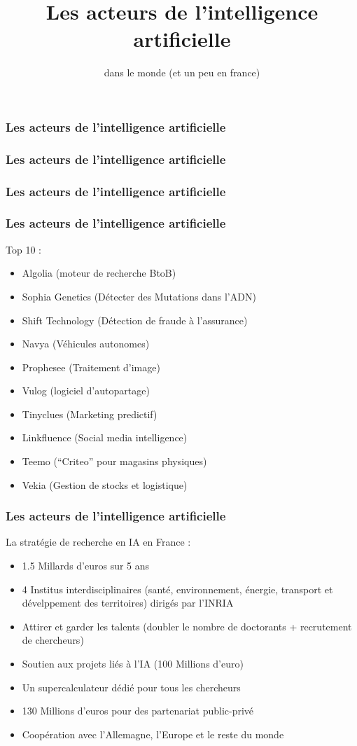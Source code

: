 \documentclass{formation}
\title{Les acteurs de l'intelligence artificielle}
\subtitle{dans le monde (et un peu en france)}
\begin{document}
\maketitle

\begin{frame}
  \frametitle{Les acteurs de l'intelligence artificielle}
\end{frame}

\begin{frame}
  \frametitle{Les acteurs de l'intelligence artificielle}
\end{frame}

\begin{frame}
  \frametitle{Les acteurs de l'intelligence artificielle}
\end{frame}

\begin{frame}
  \frametitle{Les acteurs de l'intelligence artificielle}
  Top 10 :
  \begin{itemize}
  \item Algolia (moteur de recherche BtoB)
  \item Sophia Genetics (Détecter des Mutations dans l'ADN)
  \item Shift Technology (Détection de fraude à l'assurance)
  \item Navya (Véhicules autonomes)
  \item Prophesee (Traitement d'image)
  \item Vulog (logiciel d'autopartage)
  \item Tinyclues (Marketing predictif)
  \item Linkfluence (Social media intelligence)
  \item Teemo (``Criteo'' pour magasins physiques)
  \item Vekia (Gestion de stocks et logistique)
  \end{itemize}
\end{frame}

\begin{frame}
  \frametitle{Les acteurs de l'intelligence artificielle}
  La stratégie de recherche en IA en France :
  \begin{itemize}
  \item 1.5 Millards d'euros sur 5 ans
  \item 4 Institus interdisciplinaires (santé, environnement, énergie, transport et dévelppement des territoires) dirigés par l'INRIA
  \item Attirer et garder les talents (doubler le nombre de doctorants + recrutement de chercheurs)
  \item Soutien aux projets liés à l'IA (100 Millions d'euro)
  \item Un supercalculateur dédié pour tous les chercheurs
  \item 130 Millions d'euros pour des partenariat public-privé
  \item Coopération avec l'Allemagne, l'Europe et le reste du monde
  \end{itemize}
\end{frame}
\end{document}
